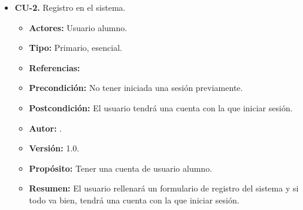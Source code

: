 \begin{itemize}
    \newpage






  \item \textbf{CU-2.} Registro en el sistema.
  \begin{itemize}
    \item \textbf{Actores:} Usuario alumno.
    \item \textbf{Tipo:} Primario, esencial.
    \item \textbf{Referencias:}
    \item \textbf{Precondición:} No tener iniciada una sesión previamente.
    \item \textbf{Postcondición:} El usuario tendrá una cuenta con la que iniciar sesión.
    \item \textbf{Autor:} \autor.
    \item \textbf{Versión:} 1.0.
    \item \textbf{Propósito:} Tener una cuenta de usuario alumno.
    \item \textbf{Resumen:} El usuario rellenará un formulario de registro del sistema y si todo va bien, tendrá una cuenta con la que iniciar sesión.


\end{itemize}
\end{itemize}
